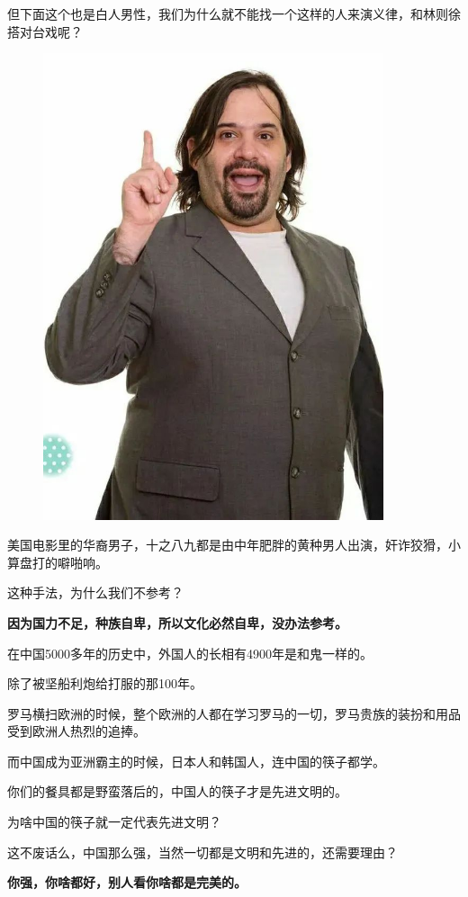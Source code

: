 \documentclass[UTF8, 11pt, oneside]{ctexart}
\newcommand{\zd}[1]{\textbf{\textcolor[RGB]{123,12,0}{#1}}} %
\begin{document}
但下面这个也是白人男性，我们为什么就不能找一个这样的人来演义律，和林则徐搭对台戏呢？

\begin{figure}[H]
    \centering
    \includegraphics[width=10cm]{2023-09-06-009.jpg}
\end{figure}

美国电影里的华裔男子，十之八九都是由中年肥胖的黄种男人出演，奸诈狡猾，小算盘打的噼啪响。

这种手法，为什么我们不参考？

\zd{因为国力不足，种族自卑，所以文化必然自卑，没办法参考。}

在中国5000多年的历史中，外国人的长相有4900年是和鬼一样的。

除了被坚船利炮给打服的那100年。

罗马横扫欧洲的时候，整个欧洲的人都在学习罗马的一切，罗马贵族的装扮和用品受到欧洲人热烈的追捧。

而中国成为亚洲霸主的时候，日本人和韩国人，连中国的筷子都学。

你们的餐具都是野蛮落后的，中国人的筷子才是先进文明的。

为啥中国的筷子就一定代表先进文明？

这不废话么，中国那么强，当然一切都是文明和先进的，还需要理由？

\zd{你强，你啥都好，别人看你啥都是完美的。}
\end{document}
